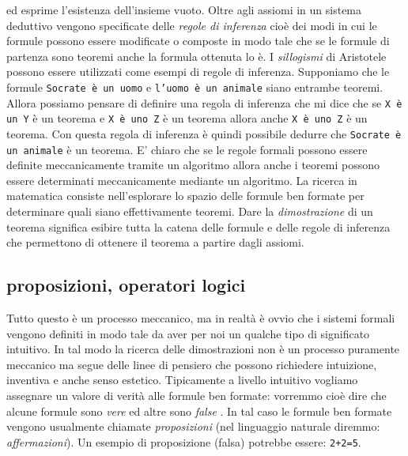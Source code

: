 ed esprime l'esistenza dell'insieme vuoto.
Oltre agli assiomi in un sistema deduttivo vengono specificate delle 
\emph{regole di inferenza} cioè dei modi in cui 
le formule possono essere modificate o composte in modo tale che se le formule 
di partenza sono teoremi anche la formula ottenuta lo è.
I \emph{sillogismi} di Aristotele possono essere utilizzati come esempi di regole 
di inferenza. 
Supponiamo che le formule 
\texttt{Socrate è un uomo} 
e \texttt{l'uomo è un animale}
siano entrambe teoremi. Allora possiamo pensare di definire una regola di inferenza 
che mi dice che se \texttt{X è un Y} è un teorema 
e \texttt{X è uno Z}
è un teorema allora anche \texttt{X è uno Z} è un teorema. 
Con questa regola di inferenza è quindi possibile dedurre che 
\texttt{Socrate è un animale}
è un teorema.
E' chiaro che se le regole formali possono essere definite meccanicamente 
tramite un algoritmo allora anche i teoremi possono essere determinati meccanicamente 
mediante un algoritmo.
La ricerca in matematica consiste nell'esplorare lo spazio delle formule ben formate 
per determinare quali siano effettivamente teoremi. 
Dare la \emph{dimostrazione}%
%
 di un teorema significa esibire tutta la catena delle formule 
e delle regole di inferenza che permettono di ottenere il teorema a partire dagli 
assiomi.

\subsection{proposizioni, operatori logici}

Tutto questo è un processo meccanico, ma in realtà è ovvio che i sistemi formali 
vengono definiti in modo tale da aver per noi un qualche tipo di significato intuitivo.
In tal modo la ricerca delle dimostrazioni non è un processo puramente meccanico 
ma segue delle linee di pensiero che possono richiedere intuizione, inventiva e anche 
senso estetico. 
Tipicamente a livello intuitivo vogliamo assegnare un valore di verità alle formule 
ben formate: vorremmo cioè dire che alcune formule sono 
\emph{vere}%
%
ed altre sono 
\emph{false}%
%
. 
In tal caso le formule ben formate vengono usualmente chiamate \emph{proposizioni}%
%
(nel linguaggio naturale diremmo: \emph{affermazioni}).
Un esempio di proposizione (falsa) potrebbe essere: 
\texttt{2+2=5}.

